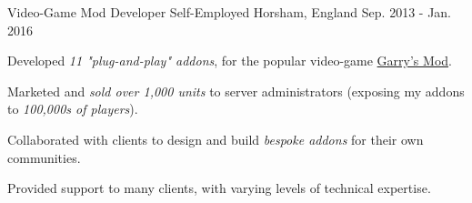 \begin{cventries}
\cventry
{Video-Game Mod Developer} %
{Self-Employed} %
{Horsham, England} %
{Sep. 2013 - Jan. 2016} %
{
  \begin{cvitems} %
    \item Developed \textit{11 "plug-and-play" addons}, for the popular video-game \href{https://gmod.facepunch.com/}{Garry's Mod}.
    \item Marketed and \textit{sold over 1,000 units} to server administrators (exposing my addons to \textit{100,000s of players}).
    \item Collaborated with clients to design and build \textit{bespoke addons} for their own communities.
    \item Provided support to many clients, with varying levels of technical expertise.
  \end{cvitems}
}
{}


\end{cventries}
